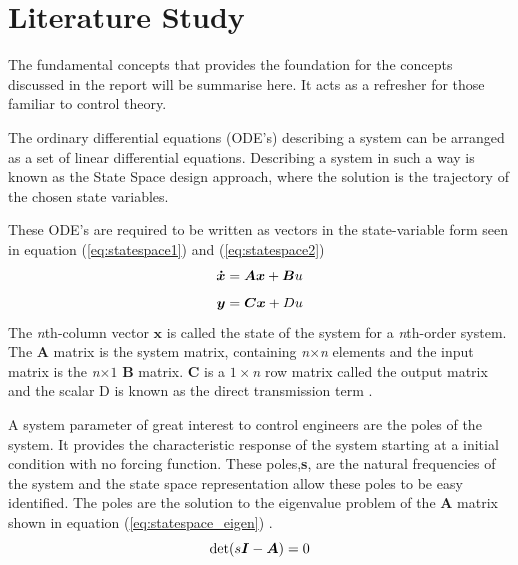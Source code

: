 \documentclass[a4paper,12pt]{article}
\begin{document}
	\section{Literature Study}
	The fundamental concepts that provides the foundation for the concepts discussed in the report will be summarise here. It acts as a refresher for those familiar to control theory. 
	
	The ordinary differential equations (ODE's) describing a system can be arranged as a set of linear differential equations. Describing a system in such a way is known as the State Space design approach, where the solution is the trajectory of the chosen state variables.\cite{textbook}
	
	These ODE's are required to be written as vectors in the state-variable form seen in equation (\ref{eq:statespace1}) and (\ref{eq:statespace2})
	\begin{equation} \label{eq:statespace1}
	\centering
	\boldsymbol{\dot{x}} = \boldsymbol{A}\boldsymbol{x} + \boldsymbol{B}u
	\end{equation}
	\begin{equation} \label{eq:statespace2}
	\centering
	\boldsymbol{y} = \boldsymbol{C}\boldsymbol{x} + Du
	\end{equation}
	 The \textit{n}th-column vector $\boldsymbol{x}$ is called the state of the system for a \textit{n}th-order system. The \textbf{A} matrix is the system matrix, containing \textit{n}$\times$\textit{n} elements and the input matrix is the \textit{n}$\times 1$ \textbf{B} matrix. \textbf{C} is a $1\times$\textit{n} row matrix called the output matrix and the scalar D is known as the direct transmission term \cite{textbook}.
	 
	 A system parameter of great interest to control engineers are the poles of the system. It provides the characteristic response of the system starting at a initial condition with no forcing function. These poles,\textbf{s}, are the natural frequencies of the system and the state space representation allow these poles to be easy identified. The poles are the solution to the eigenvalue problem of the \textbf{A} matrix shown in equation (\ref{eq:statespace_eigen}) \cite{textbook}.
	 \begin{equation} \label{eq:statespace_eigen}
	 \centering
	 \text{det}(s\boldsymbol{I} - \boldsymbol{A}) = 0
	 \end{equation}
	 
\end{document}

